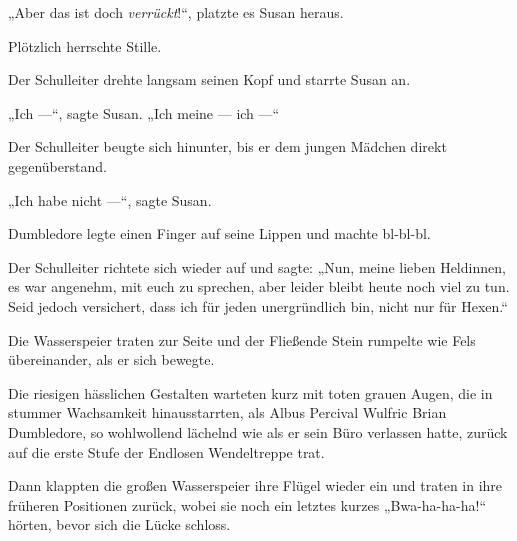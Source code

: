„Aber das ist doch \emph{verrückt}!“, platzte es Susan heraus.

Plötzlich herrschte Stille.

Der Schulleiter drehte langsam seinen Kopf und starrte Susan an.

„Ich —“, sagte Susan.
„Ich meine — ich —“

Der Schulleiter beugte sich hinunter, bis er dem jungen Mädchen direkt gegenüberstand.

„Ich habe nicht —“, sagte Susan.

Dumbledore legte einen Finger auf seine Lippen und machte bl-bl-bl.

Der Schulleiter richtete sich wieder auf und sagte:
„Nun, meine lieben Heldinnen, es war angenehm, mit euch zu sprechen, aber leider bleibt heute noch viel zu tun. Seid jedoch versichert, dass ich für jeden unergründlich bin, nicht nur für Hexen.“

Die Wasserspeier traten zur Seite und der Fließende Stein rumpelte wie Fels übereinander, als er sich bewegte.

Die riesigen hässlichen Gestalten warteten kurz mit toten grauen Augen, die in stummer Wachsamkeit hinausstarrten, als Albus Percival Wulfric Brian Dumbledore, so wohlwollend lächelnd wie als er sein Büro verlassen hatte, zurück auf die erste Stufe der Endlosen Wendeltreppe trat.

Dann klappten die großen Wasserspeier ihre Flügel wieder ein und traten in ihre früheren Positionen zurück, wobei sie noch ein letztes kurzes
„Bwa-ha-ha-ha!“ hörten, bevor sich die Lücke schloss.

